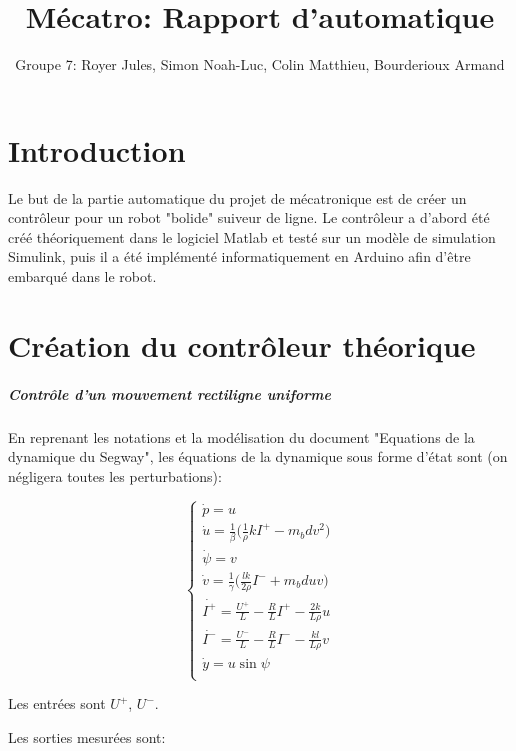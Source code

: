 \documentclass{report}
\title{Mécatro: Rapport d'automatique}
\author{Groupe 7: Royer Jules, Simon Noah-Luc, Colin Matthieu, Bourderioux Armand}
\date{}
\begin{document}
\maketitle

\tableofcontents

\chapter{Introduction}
Le but de la partie automatique du projet de mécatronique est de créer un contrôleur
pour un robot "bolide" suiveur de ligne. Le contrôleur a d'abord été créé théoriquement
dans le logiciel Matlab et testé sur un modèle de simulation Simulink, puis il a été
implémenté informatiquement en Arduino afin d'être embarqué dans le robot.

\chapter{Création du contrôleur théorique}

\paragraph{Contrôle d'un mouvement rectiligne uniforme}

En reprenant les notations et la modélisation du document "Equations de la dynamique du Segway",
les équations de la dynamique sous forme d'état sont (on négligera toutes les perturbations):

\begin{equation*}
    \begin{cases}
        \dot{p} = u \\
        \dot{u} = \frac{1}{\beta}\big( \frac{1}{\rho}kI^{+} - m_bdv^2 \big) \\
        \dot{\psi} = v \\
        \dot{v} = \frac{1}{\gamma}\big( \frac{lk}{2\rho}I^{-} + m_bduv \big) \\
        \dot{I^{+}} = \frac{U^{+}}{L} - \frac{R}{L}I^{+} - \frac{2k}{L\rho}u \\
        \dot{I^{-}} = \frac{U^{-}}{L} - \frac{R}{L}I^{-} - \frac{kl}{L\rho}v \\
        \dot{y} = u\sin\psi \\
    \end{cases}
\end{equation*}

Les entrées sont $U^{+}$, $U^{-}$.

Les sorties mesurées sont:
\end{document}
